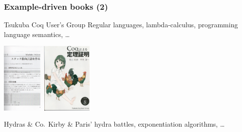 \documentclass[10pt]{beamer}
\newcommand{\Hydras}{Hydras \& Co$\text.$\xspace}
\begin{document}
\begin{frame}
  \frametitle{Example-driven books (2)}
  \begin{block}{Tsukuba Coq User's Group}
    Regular languages, lambda-calculus, programming language semantics, \dots
    
   \includegraphics[height=35mm]{tsukubabooks.jpg}
     \end{block}
     \begin{block}{\Hydras}
       Kirby \& Paris'  hydra battles, exponentiation algorithms, \dots
     \end{block}

\end{frame}
\end{document}
